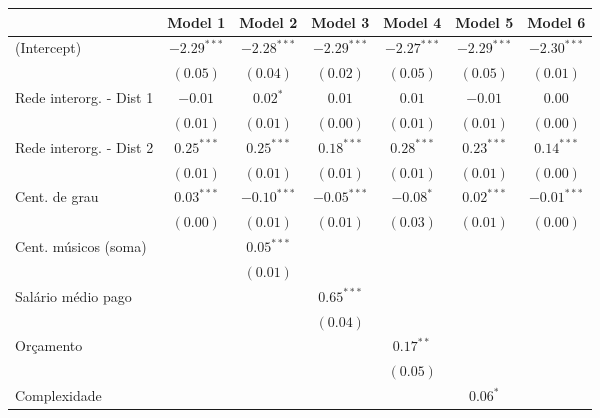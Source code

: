 \documentclass[a4paper, 12pt, openright, oneside, german, french, english, brazil]{abntex2}
\begin{document}
	
	\begin{table}[!ht]
		{\begin{tabular}{l c c c c c c }
			\hline
			 & Model 1 & Model 2 & Model 3 & Model 4 & Model 5 & Model 6 \\
			\hline
			(Intercept)                & $-2.29^{***}$ & $-2.28^{***}$ & $-2.29^{***}$ & $-2.27^{***}$ & $-2.29^{***}$ & $-2.30^{***}$ \\
			& $(0.05)$      & $(0.04)$      & $(0.02)$      & $(0.05)$      & $(0.05)$      & $(0.01)$      \\
			Rede interorg. - Dist 1           & $-0.01$       & $0.02^{*}$    & $0.01$        & $0.01$        & $-0.01$       & $0.00$        \\
			& $(0.01)$      & $(0.01)$      & $(0.00)$      & $(0.01)$      & $(0.01)$      & $(0.00)$      \\
			Rede interorg. - Dist 2          & $0.25^{***}$  & $0.25^{***}$  & $0.18^{***}$  & $0.28^{***}$  & $0.23^{***}$  & $0.14^{***}$  \\
			& $(0.01)$      & $(0.01)$      & $(0.01)$      & $(0.01)$      & $(0.01)$      & $(0.00)$      \\
			Cent. de grau                  & $0.03^{***}$  & $-0.10^{***}$ & $-0.05^{***}$ & $-0.08^{*}$   & $0.02^{***}$  & $-0.01^{***}$ \\
			& $(0.00)$      & $(0.01)$      & $(0.01)$      & $(0.03)$      & $(0.01)$      & $(0.00)$      \\
			Cent. músicos (soma) &               & $0.05^{***}$  &               &               &               &               \\
			&               & $(0.01)$      &               &               &               &               \\
			Salário médio pago         &               &               & $0.65^{***}$  &               &               &               \\
			&               &               & $(0.04)$      &               &               &               \\
			Orçamento        &               &               &               & $0.17^{**}$   &               &               \\
			&               &               &               & $(0.05)$      &               &               \\
			Complexidade     &               &               &               &               & $0.06^{*}$    &               \\

\end{tabular}}
\end{table}
\end{document}
